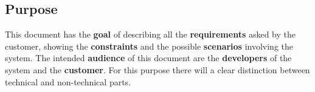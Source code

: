 
\subsection{Purpose}
This document has the \textbf{goal} of describing all the \textbf{requirements} asked by the customer, showing the \textbf{constraints} and the possible \textbf{scenarios} involving the system.
The intended \textbf{audience} of this document are the \textbf{developers} of the system and the \textbf{customer}. For this purpose there will a clear distinction between technical and non-technical parts.